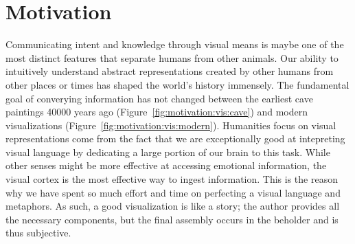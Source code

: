 \chapter{Motivation} \label{cha:motivation}
Communicating intent and knowledge through visual means is maybe one of the most distinct features that separate humans from other animals. Our ability to intuitively understand abstract representations created by other humans from other places or times has shaped the world's history immensely.  The fundamental goal of converying information has not changed between the earliest cave paintings 40000 years ago (Figure~\ref{fig:motivation:vis:cave}) and modern visualizations (Figure~\ref{fig:motivation:vis:modern}).  Humanities focus on visual representations come from the fact that we are exceptionally good at intepreting visual language by dedicating a large portion of our brain to this task.  While other senses might be more effective at accessing emotional information, the visual cortex is the most effective way to ingest information.  This is the reason why we have spent so much effort and time on perfecting a visual language and metaphors.  As such, a good visualization is like a story; the author provides all the necessary components, but the final assembly occurs in the beholder and is thus subjective.


